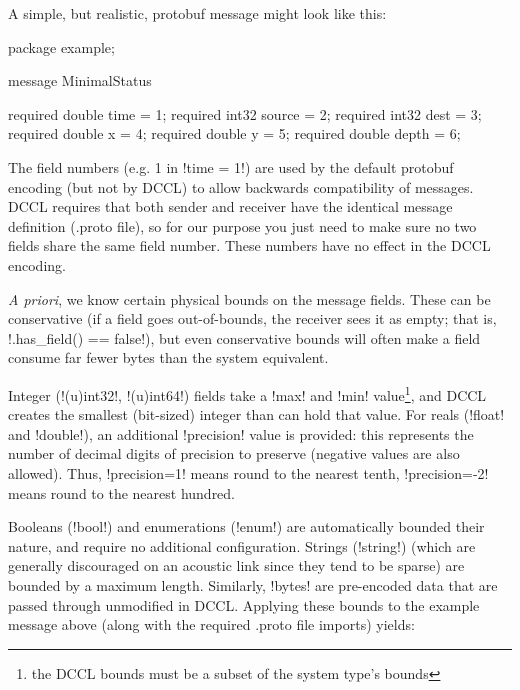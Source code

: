 A simple, but realistic, protobuf message might look like this:

\begin{boxedverbatim}
package example;

message MinimalStatus
{ 

  required double time = 1;
  required int32 source = 2;
  required int32 dest = 3;
  required double x = 4;
  required double y = 5;  
  required double depth = 6;
} 
\end{boxedverbatim}
\resetbvlinenumber

The field numbers (e.g. 1 in !time = 1!) are used by the default protobuf encoding (but not by DCCL) to allow backwards compatibility of messages. DCCL requires that both sender and receiver have the identical message definition (.proto file), so for our purpose you just need to make sure no two fields share the same field number. These numbers have no effect in the DCCL encoding.

\textit{A priori}, we know certain physical bounds on the message fields. These can be conservative (if a field goes out-of-bounds, the receiver sees it as empty; that is, !.has_field() == false!), but even conservative bounds will often make a field consume far fewer bytes than the system equivalent. 

Integer (!(u)int32!, !(u)int64!) fields take a !max! and !min! value\footnote{the DCCL bounds must be a subset of the system type's bounds}, and DCCL creates the smallest (bit-sized) integer than can hold that value. For reals (!float! and !double!), an additional !precision! value is provided: this represents the number of decimal digits of precision to preserve (negative values are also allowed). Thus, !precision=1! means round to the nearest tenth, !precision=-2! means round to the nearest hundred.

Booleans (!bool!) and enumerations (!enum!) are automatically bounded their nature, and require no additional configuration. Strings (!string!) (which are generally discouraged on an acoustic link since they tend to be sparse) are bounded by a maximum length. Similarly, !bytes! are pre-encoded data that are passed through unmodified in DCCL. Applying these bounds to the example message above (along with the required .proto file imports) yields:

